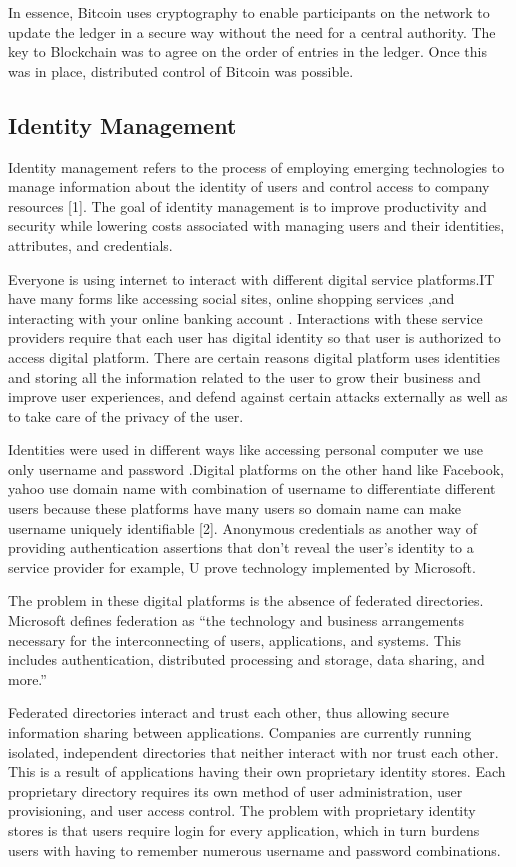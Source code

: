 In essence, Bitcoin uses cryptography to enable participants on the network to update the ledger in a secure way without the need for a central authority. The key to Blockchain was to agree on the order of entries in the ledger. Once this was in place, distributed control of Bitcoin was possible.

\subsection{Identity Management}
Identity management refers to the process of employing emerging technologies to manage information about the identity of users and control access to company resources [1]. The goal of identity management is to improve productivity and security while lowering costs associated with managing users and their identities, attributes, and credentials.

Everyone is using internet to interact with different digital service platforms.IT have many forms like accessing social sites, online shopping services ,and interacting with your online banking account . Interactions with these service providers require that each user has digital identity so that user is authorized to access digital platform. There are certain reasons digital platform uses identities and storing all the information related to the user to grow their business and improve user experiences, and defend against certain attacks externally as well as to take care of the privacy of the user.

Identities were used in different ways like accessing personal computer we use only username and password .Digital platforms on the other hand like Facebook, yahoo use domain name with combination of username to differentiate different users because these platforms have many users so domain name can make username uniquely identifiable [2]. Anonymous credentials as another way of providing authentication
assertions that don’t reveal the user’s identity to a service provider for example, U prove technology implemented by Microsoft.

The problem in these digital platforms is the absence of federated directories. Microsoft defines federation as “the technology and business arrangements necessary for the interconnecting of users, applications, and systems. This includes
authentication, distributed processing and storage, data sharing, and more.”

Federated directories interact and trust each other, thus allowing secure information sharing between applications. Companies are currently running isolated, independent directories that neither interact with nor trust each other.
This is a result of applications having their own proprietary identity stores. Each
proprietary directory requires its own method of user administration, user
provisioning, and user access control. The problem with proprietary identity stores is that users require login for every application, which in turn burdens users with having to remember numerous username and password combinations.


